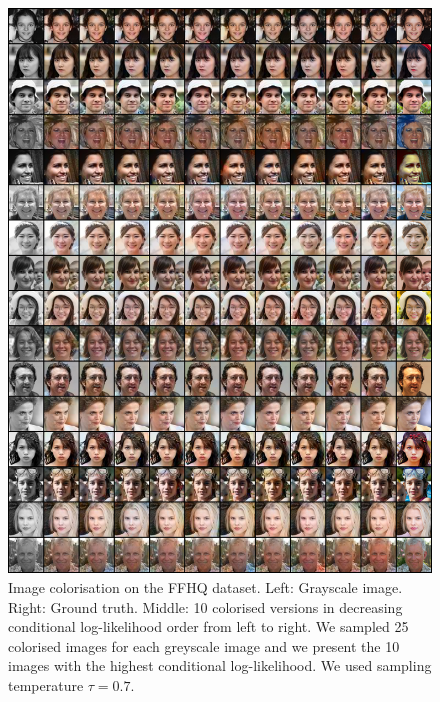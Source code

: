 \begin{figure}[h!]
    \centering
    \includegraphics[width=\textwidth]{Chapter1/paper_graphs/SupplementaryMaterial/colorization_ffhq_0.7_1.png}
    \caption{Image colorisation on the FFHQ dataset. Left: Grayscale image. Right: Ground truth. Middle: 10 colorised versions in decreasing conditional log-likelihood order from left to right. We sampled 25 colorised images for each greyscale image and we present the 10 images with the highest conditional log-likelihood. We used sampling temperature $\tau=0.7$.}
\end{figure}

\clearpage
